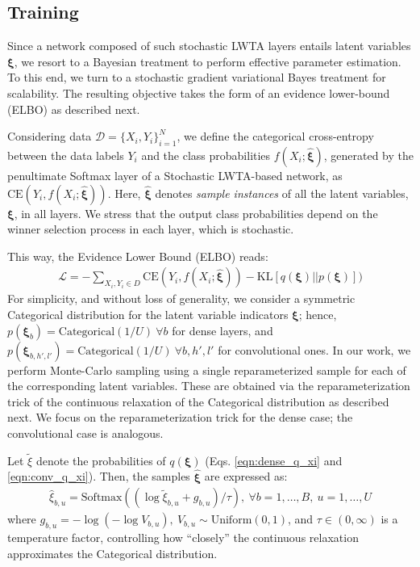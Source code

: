 \documentclass{article}
\begin{document}
	\subsection{Training}
	
	Since a network composed of such stochastic LWTA layers entails latent variables $\boldsymbol \xi$, we resort to a Bayesian treatment to perform effective parameter estimation. To this end, we turn to a stochastic gradient variational Bayes treatment \citep{kingma2014autoencoding} for scalability. The resulting objective takes the form of an evidence lower-bound (ELBO) as described next. 
	
	
	Considering data $\mathcal{D} = \{X_i, Y_i\}_{i=1}^N$, we define the categorical cross-entropy between the data labels $Y_i$ and the class probabilities $f(X_i;\hat{\boldsymbol\xi})$, generated by the penultimate Softmax layer of a Stochastic LWTA-based network, as $\mathrm{CE}(Y_i, f(X_i;\hat{\boldsymbol\xi}))$. Here, $\hat{\boldsymbol\xi}$ denotes \textit{sample instances} of all the latent variables, $\boldsymbol\xi$, in all layers. We stress that the output class probabilities depend on the winner selection process in each layer, which is stochastic. 
	
	This way, the Evidence Lower Bound (ELBO) reads:
	\begin{align}
		\mathcal{L} = -\sum_{X_i, Y_i \in D} \mathrm{CE}(Y_i, f(X_i;\hat{\boldsymbol\xi})) - \mathrm{KL}[q(\boldsymbol\xi)||p(\boldsymbol\xi)])
		\label{eqn:elbo}
	\end{align} 
For simplicity, and without loss of generality, we consider a symmetric Categorical distribution for the latent variable indicators $\boldsymbol \xi$; hence,  $p(\boldsymbol\xi_b) = \mathrm{Categorical}(1/U) \ \forall b$ for dense layers, and $p(\boldsymbol\xi_{b,h',l'}) = \mathrm{Categorical}(1/U) \ \forall b, h',l'$ for convolutional ones. In our work, we perform Monte-Carlo sampling using a single reparameterized sample for each of the corresponding latent variables. These are obtained via the reparameterization trick of the continuous relaxation of the Categorical distribution \citep{maddison, jang} as described next. We focus on the reparameterization trick for the dense case; the convolutional case is analogous.
	
	Let $\tilde{\xi}$ denote the probabilities of $q(\boldsymbol \xi)$ (Eqs. \eqref{eqn:dense_q_xi} and \eqref{eqn:conv_q_xi}). Then, the samples $\hat{\boldsymbol\xi}$ are expressed as:
\begin{align}
	    \hat{\xi}_{b,u} = \mathrm{Softmax}((\log \tilde{\xi}_{b,u} + g_{b,u})/\tau), \ \forall b=1,\dots, B, \ u=1, \dots, U
	\end{align}
	where $g_{b,u} = -\log(-\log V_{b,u}), \ V_{b,u} \sim \mathrm{Uniform}(0,1)$, and $\tau \in (0, \infty)$ is a temperature factor, controlling how ``closely'' the continuous relaxation approximates the Categorical distribution. 
\end{document}

